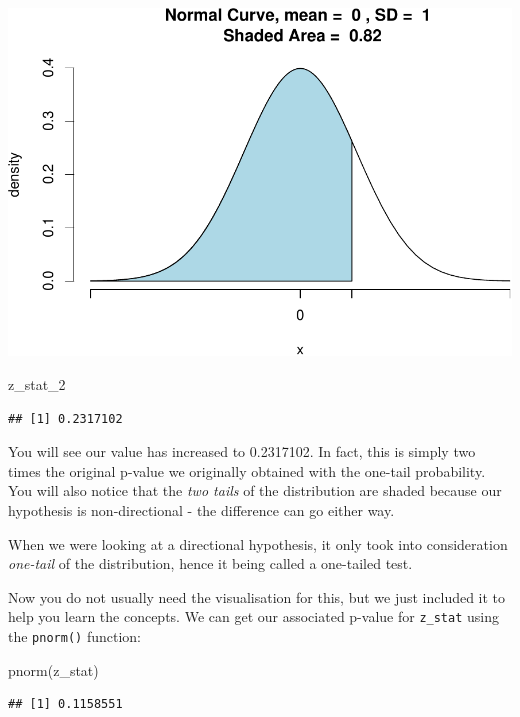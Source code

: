 \documentclass[
]{book}
\newenvironment{Shaded}{\begin{snugshade}}{\end{snugshade}}
\newcommand{\FunctionTok}[1]{\textcolor[rgb]{0.00,0.00,0.00}{#1}}
\newcommand{\NormalTok}[1]{#1}
\begin{document}
\includegraphics{06-hypotheses_files/figure-latex/unnamed-chunk-30-1.pdf}

\begin{Shaded}
\begin{Highlighting}[]
\NormalTok{z\_stat\_2 }
\end{Highlighting}
\end{Shaded}

\begin{verbatim}
## [1] 0.2317102
\end{verbatim}

You will see our value has increased to 0.2317102. In fact, this is simply two times the original p-value we originally obtained with the one-tail probability. You will also notice that the \emph{two tails} of the distribution are shaded because our hypothesis is non-directional - the difference can go either way.

When we were looking at a directional hypothesis, it only took into consideration \emph{one-tail} of the distribution, hence it being called a one-tailed test.

Now you do not usually need the visualisation for this, but we just included it to help you learn the concepts. We can get our associated p-value for \texttt{z\_stat} using the \texttt{pnorm()} function:

\begin{Shaded}
\begin{Highlighting}[]
\FunctionTok{pnorm}\NormalTok{(z\_stat)}
\end{Highlighting}
\end{Shaded}

\begin{verbatim}
## [1] 0.1158551
\end{verbatim}
\end{document}
